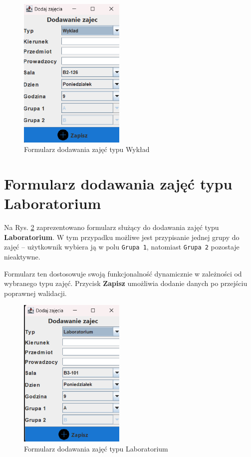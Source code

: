 \begin{figure}[H]
\centering
\includegraphics[width=0.45\textwidth]{figures/workApl/add_wyklad_panel.png}
\caption{Formularz dodawania zajęć typu Wykład}
\label{fig:add_wyklad}
\end{figure}

\clearpage

\section*{Formularz dodawania zajęć typu Laboratorium}

Na Rys. \ref{fig:add_lab} zaprezentowano formularz służący do dodawania zajęć typu \textbf{Laboratorium}. W tym przypadku możliwe jest przypisanie jednej grupy do zajęć – użytkownik wybiera ją w polu \texttt{Grupa 1}, natomiast \texttt{Grupa 2} pozostaje nieaktywne.

Formularz ten dostosowuje swoją funkcjonalność dynamicznie w zależności od wybranego typu zajęć. Przycisk \textbf{Zapisz} umożliwia dodanie danych po przejściu poprawnej walidacji.

\begin{figure}[H]
\centering
\includegraphics[width=0.45\textwidth]{figures/workApl/add_lab_panel.png}
\caption{Formularz dodawania zajęć typu Laboratorium}
\label{fig:add_lab}
\end{figure}

